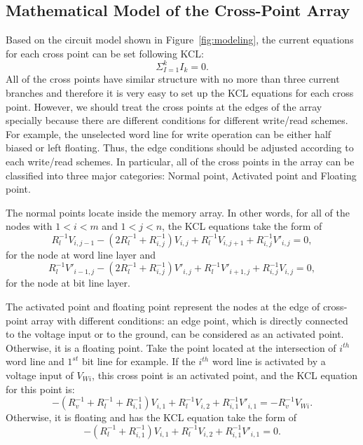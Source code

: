 \subsection{Mathematical Model of the Cross-Point Array}
Based on the circuit model shown in Figure~\ref{fig:modeling}, the current equations for each cross point can be set following KCL:
\begin{equation}
  {\Sigma}_{I=1}^kI_k=0.
\end{equation}
 All of the cross points have similar structure with no more than three current branches and therefore it is very easy to set up the KCL equations for each cross point. However, we should treat the cross points at the edges of the array specially because there are different conditions for different write/read schemes. For example, the unselected word line for write operation can be either half biased or left floating. Thus, the edge conditions should be adjusted according to each write/read schemes. In particular, all of the cross points in the array can be classified into three major categories: Normal point, Activated point and Floating point.

The normal points locate inside the memory array. In other words, for all of the nodes with $1<i<m$ and $1<j<n$, the KCL equations take the form of
\begin{equation}\label{equ:KCL1}
R_l^{-1}V_{i,j-1} -(2R_l^{-1}+R_{i,j}^{-1})V_{i,j}+ R_l^{-1}V_{i,j+1}+R_{i,j}^{-1}V'_{i,j}=0,
\end{equation}
for the node at word line layer and
\begin{equation}\label{equ:KCL2}
R_l^{-1}V'_{i-1,j} -(2R_l^{-1}+R_{i,j}^{-1})V'_{i,j}+ R_l^{-1}V'_{i+1,j}+R_{i,j}^{-1}V_{i,j}=0,
\end{equation}
for the node at bit line layer.

The activated point and floating point represent the nodes at the edge of cross-point array with different conditions: an edge point, which is directly connected to the voltage input or to the ground, can be considered as an activated point. Otherwise, it is a floating point. Take the point located at the intersection of $i^{th}$ word line and $1^{st}$ bit line for example. If the $i^{th}$ word line is activated by a voltage input of $V_{Wi}$, this cross point is an activated point, and the KCL equation for this point is:
\begin{equation}\label{equ:KCL3}
-(R_v^{-1}+R_l^{-1}+R_{i,1}^{-1})V_{i,1}+ R_l^{-1}V_{i,2}+R_{i,1}^{-1}V'_{i,1}=-R_v^{-1}V_{Wi}.
\end{equation}
Otherwise, it is floating and has the KCL equation take the form of
\begin{equation}\label{equ:KCL4}
-(R_l^{-1}+R_{i,1}^{-1})V_{i,1}+ R_l^{-1}V_{i,2}+R_{i,1}^{-1}V'_{i,1}=0.
\end{equation}

